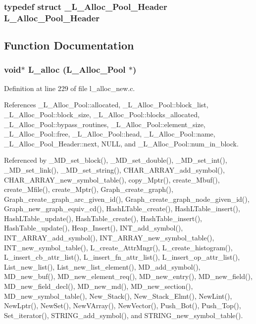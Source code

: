 \subsubsection{\setlength{\rightskip}{0pt plus 5cm}typedef struct \bf{\_\-L\_\-Alloc\_\-Pool\_\-Header}
 \bf{L\_\-Alloc\_\-Pool\_\-Header}}\label{l__alloc__new_8h_b0098662f08d7359b6f71f79efc7f6ed}




\subsection{Function Documentation}
\subsubsection{\setlength{\rightskip}{0pt plus 5cm}void$\ast$ L\_\-alloc (\bf{L\_\-Alloc\_\-Pool} $\ast$)}\label{l__alloc__new_8h_cc42721dc9fbaf73217c241a82423b40}




Definition at line 229 of file l\_\-alloc\_\-new.c.

References \_\-L\_\-Alloc\_\-Pool::allocated, \_\-L\_\-Alloc\_\-Pool::block\_\-list, \_\-L\_\-Alloc\_\-Pool::block\_\-size, \_\-L\_\-Alloc\_\-Pool::blocks\_\-allocated, \_\-L\_\-Alloc\_\-Pool::bypass\_\-routines, \_\-L\_\-Alloc\_\-Pool::element\_\-size, \_\-L\_\-Alloc\_\-Pool::free, \_\-L\_\-Alloc\_\-Pool::head, \_\-L\_\-Alloc\_\-Pool::name, \_\-L\_\-Alloc\_\-Pool\_\-Header::next, NULL, and \_\-L\_\-Alloc\_\-Pool::num\_\-in\_\-block.

Referenced by \_\-MD\_\-set\_\-block(), \_\-MD\_\-set\_\-double(), \_\-MD\_\-set\_\-int(), \_\-MD\_\-set\_\-link(), \_\-MD\_\-set\_\-string(), CHAR\_\-ARRAY\_\-add\_\-symbol(), CHAR\_\-ARRAY\_\-new\_\-symbol\_\-table(), copy\_\-Mptr(), create\_\-Mbuf(), create\_\-Mfile(), create\_\-Mptr(), Graph\_\-create\_\-graph(), Graph\_\-create\_\-graph\_\-arc\_\-given\_\-id(), Graph\_\-create\_\-graph\_\-node\_\-given\_\-id(), Graph\_\-new\_\-graph\_\-equiv\_\-cd(), Hash\-LTable\_\-create(), Hash\-LTable\_\-insert(), Hash\-LTable\_\-update(), Hash\-Table\_\-create(), Hash\-Table\_\-insert(), Hash\-Table\_\-update(), Heap\_\-Insert(), INT\_\-add\_\-symbol(), INT\_\-ARRAY\_\-add\_\-symbol(), INT\_\-ARRAY\_\-new\_\-symbol\_\-table(), INT\_\-new\_\-symbol\_\-table(), L\_\-create\_\-Attr\-Mngr(), L\_\-create\_\-histogram(), L\_\-insert\_\-cb\_\-attr\_\-list(), L\_\-insert\_\-fn\_\-attr\_\-list(), L\_\-insert\_\-op\_\-attr\_\-list(), List\_\-new\_\-list(), List\_\-new\_\-list\_\-element(), MD\_\-add\_\-symbol(), MD\_\-new\_\-buf(), MD\_\-new\_\-element\_\-req(), MD\_\-new\_\-entry(), MD\_\-new\_\-field(), MD\_\-new\_\-field\_\-decl(), MD\_\-new\_\-md(), MD\_\-new\_\-section(), MD\_\-new\_\-symbol\_\-table(), New\_\-Stack(), New\_\-Stack\_\-Elmt(), New\-Lint(), New\-Lptr(), New\-Set(), New\-VArray(), New\-Vector(), Push\_\-Bot(), Push\_\-Top(), Set\_\-iterator(), STRING\_\-add\_\-symbol(), and STRING\_\-new\_\-symbol\_\-table().
